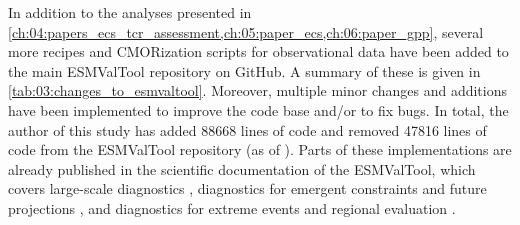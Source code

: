 In addition to the analyses presented in
\cref{ch:04:papers_ecs_tcr_assessment,ch:05:paper_ecs,ch:06:paper_gpp}, several
more recipes and \ac{CMOR}ization scripts for observational data have been
added to the main \ac{ESMValTool} repository on GitHub. A summary of these is
given in \cref{tab:03:changes_to_esmvaltool}. Moreover, multiple minor changes
and additions have been implemented to improve the code base and/or to fix
bugs. In total, the author of this study has added 88668 lines of code and
removed 47816 lines of code from the \ac{ESMValTool} repository (as of
\TheMonth{}). Parts of these implementations are already published in the
scientific documentation of the \ac{ESMValTool}, which covers large-scale
diagnostics \autocite{Eyring2020}, diagnostics for emergent constraints and
future projections \autocite{Lauer2020}, and diagnostics for extreme events and
regional evaluation \autocite{Weigel2020}.

